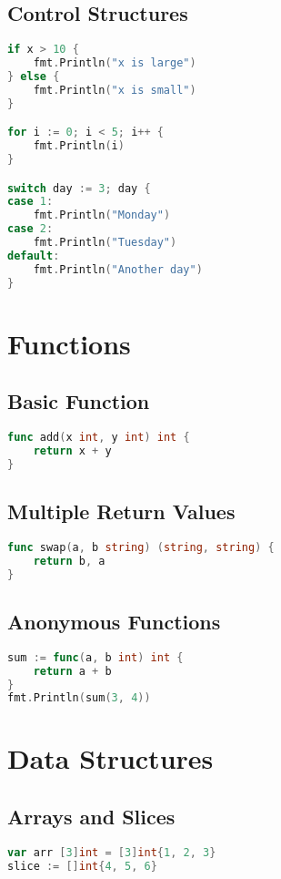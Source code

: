 \documentclass[a4paper,10pt]{article}
\begin{document}
\begin{multicols*}{2}
\subsection{Control Structures}
\begin{lstlisting}[language=Go]
if x > 10 {
    fmt.Println("x is large")
} else {
    fmt.Println("x is small")
}

for i := 0; i < 5; i++ {
    fmt.Println(i)
}

switch day := 3; day {
case 1:
    fmt.Println("Monday")
case 2:
    fmt.Println("Tuesday")
default:
    fmt.Println("Another day")
}
\end{lstlisting}

\section{Functions}
\subsection{Basic Function}
\begin{lstlisting}[language=Go]
func add(x int, y int) int {
    return x + y
}
\end{lstlisting}

\subsection{Multiple Return Values}
\begin{lstlisting}[language=Go]
func swap(a, b string) (string, string) {
    return b, a
}
\end{lstlisting}

\subsection{Anonymous Functions}
\begin{lstlisting}[language=Go]
sum := func(a, b int) int {
    return a + b
}
fmt.Println(sum(3, 4))
\end{lstlisting}

\section{Data Structures}
\subsection{Arrays and Slices}
\begin{lstlisting}[language=Go]
var arr [3]int = [3]int{1, 2, 3}
slice := []int{4, 5, 6}
\end{lstlisting}


\end{multicols*}
\end{document}
